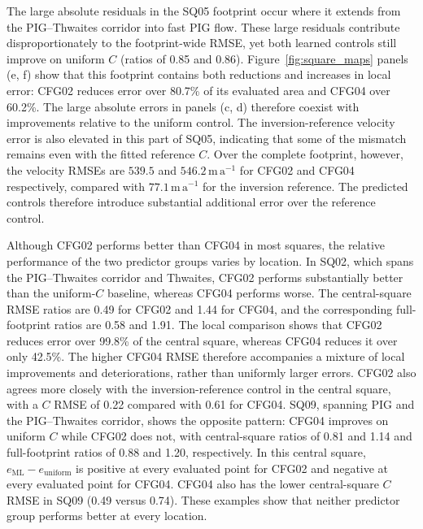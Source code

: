 \documentclass[review,jog]{igs}
\begin{document}
The large absolute residuals in the SQ05 footprint occur where it extends
from the PIG--Thwaites corridor into fast PIG flow. These large residuals
contribute disproportionately to the footprint-wide RMSE, yet both learned
controls still improve on uniform $C$ (ratios of 0.85 and 0.86).
Figure~\ref{fig:square_maps} panels (e, f) show that this footprint contains both reductions and
increases in local error: CFG02 reduces error over 80.7\% of its evaluated
area and CFG04 over 60.2\%. The large absolute errors in panels (c, d)
therefore coexist with improvements relative to the uniform control.
The inversion-reference velocity error is also elevated in this part of
SQ05, indicating that some of the mismatch remains even with the fitted
reference $C$. Over the complete footprint, however, the velocity RMSEs
are $539.5$ and $546.2\,\mathrm{m\,a^{-1}}$ for CFG02 and CFG04 respectively, compared
with $77.1\,\mathrm{m\,a^{-1}}$ for the inversion reference. The predicted
controls therefore introduce substantial additional error over the reference control.

Although CFG02 performs better than CFG04 in most squares, the relative
performance of the two predictor groups varies by location. In SQ02,
which spans the PIG--Thwaites corridor and Thwaites, CFG02 performs
substantially better than the uniform-$C$ baseline, whereas CFG04
performs worse. The central-square RMSE ratios are 0.49 for CFG02 and
1.44 for CFG04, and the corresponding full-footprint ratios are 0.58
and 1.91. The local comparison shows that CFG02 reduces error over
99.8\% of the central square, whereas CFG04 reduces it over only 42.5\%.
The higher CFG04 RMSE therefore accompanies a mixture of local
improvements and deteriorations, rather than uniformly larger errors.
CFG02 also agrees more closely with the inversion-reference control
in the central square, with a $C$ RMSE of 0.22 compared with 0.61 for
CFG04. SQ09, spanning PIG and the PIG--Thwaites corridor, shows the
opposite pattern: CFG04 improves on uniform $C$ while CFG02 does not,
with central-square ratios of 0.81 and 1.14 and full-footprint ratios
of 0.88 and 1.20, respectively. In this central square,
$e_{\mathrm{ML}}-e_{\mathrm{uniform}}$ is positive at every evaluated
point for CFG02 and negative at every evaluated point for CFG04.
CFG04 also has the lower central-square $C$ RMSE in SQ09
(0.49 versus 0.74). These examples show that neither predictor group
performs better at every location. %
\end{document}
